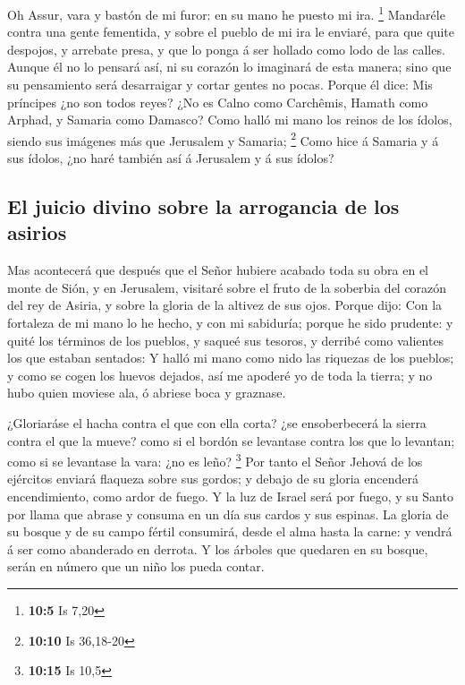  Oh Assur, vara y bastón de mi furor: en su mano he puesto
mi ira. \footnote{\textbf{10:5} Is 7,20}  Mandaréle contra
una gente fementida, y sobre el pueblo de mi ira le enviaré, para que
quite despojos, y arrebate presa, y que lo ponga á ser hollado como lodo
de las calles.  Aunque él no lo pensará así, ni su corazón
lo imaginará de esta manera; sino que su pensamiento será desarraigar y
cortar gentes no pocas.  Porque él dice: Mis príncipes ¿no
son todos reyes?  ¿No es Calno como Carchêmis, Hamath como
Arphad, y Samaria como Damasco?  Como halló mi mano los
reinos de los ídolos, siendo sus imágenes más que Jerusalem y Samaria;
\footnote{\textbf{10:10} Is 36,18-20}  Como hice á
Samaria y á sus ídolos, ¿no haré también así á Jerusalem y á sus ídolos?

\hypertarget{el-juicio-divino-sobre-la-arrogancia-de-los-asirios}{%
\subsection{El juicio divino sobre la arrogancia de los
asirios}\label{el-juicio-divino-sobre-la-arrogancia-de-los-asirios}}

 Mas acontecerá que después que el Señor hubiere acabado
toda su obra en el monte de Sión, y en Jerusalem, visitaré sobre el
fruto de la soberbia del corazón del rey de Asiria, y sobre la gloria de
la altivez de sus ojos.  Porque dijo: Con la fortaleza de
mi mano lo he hecho, y con mi sabiduría; porque he sido prudente: y
quité los términos de los pueblos, y saqueé sus tesoros, y derribé como
valientes los que estaban sentados:  Y halló mi mano como
nido las riquezas de los pueblos; y como se cogen los huevos dejados,
así me apoderé yo de toda la tierra; y no hubo quien moviese ala, ó
abriese boca y graznase.

 ¿Gloriaráse el hacha contra el que con ella corta? ¿se
ensoberbecerá la sierra contra el que la mueve? como si el bordón se
levantase contra los que lo levantan; como si se levantase la vara: ¿no
es leño? \footnote{\textbf{10:15} Is 10,5}  Por tanto el
Señor Jehová de los ejércitos enviará flaqueza sobre sus gordos; y
debajo de su gloria encenderá encendimiento, como ardor de fuego.
 Y la luz de Israel será por fuego, y su Santo por llama
que abrase y consuma en un día sus cardos y sus espinas. 
La gloria de su bosque y de su campo fértil consumirá, desde el alma
hasta la carne: y vendrá á ser como abanderado en derrota.
 Y los árboles que quedaren en su bosque, serán en número
que un niño los pueda contar.

